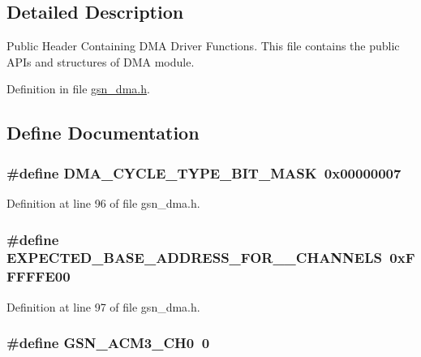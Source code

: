 \subsection{Detailed Description}
Public Header Containing DMA Driver Functions. This file contains the public APIs and structures of DMA module. 

Definition in file \hyperlink{a00484_source}{gsn\_\-dma.h}.



\subsection{Define Documentation}
\hypertarget{a00484_a40e72b47ba3036307ccfb8df8ce6437d}{
\subsubsection[{DMA\_\-CYCLE\_\-TYPE\_\-BIT\_\-MASK}]{\setlength{\rightskip}{0pt plus 5cm}\#define DMA\_\-CYCLE\_\-TYPE\_\-BIT\_\-MASK~0x00000007}}
\label{a00484_a40e72b47ba3036307ccfb8df8ce6437d}


Definition at line 96 of file gsn\_\-dma.h.

\hypertarget{a00484_a81e433569c626192ca7b5088235dbda4}{
\subsubsection[{EXPECTED\_\-BASE\_\-ADDRESS\_\-FOR\_\-10\_\-CHANNELS}]{\setlength{\rightskip}{0pt plus 5cm}\#define EXPECTED\_\-BASE\_\-ADDRESS\_\-FOR\_\_\-CHANNELS~0xFFFFFE00}}
\label{a00484_a81e433569c626192ca7b5088235dbda4}


Definition at line 97 of file gsn\_\-dma.h.

\hypertarget{a00484_a645b22e6469e278bf6deccf1488f6edb}{
\subsubsection[{GSN\_\-ACM3\_\-CH0}]{\setlength{\rightskip}{0pt plus 5cm}\#define GSN\_\-ACM3\_\-CH0~0}}
\label{a00484_a645b22e6469e278bf6deccf1488f6edb}



